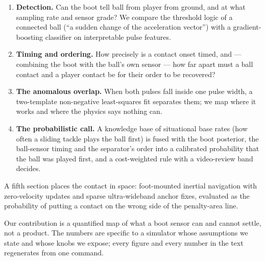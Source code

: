 \begin{enumerate}
\item \textbf{Detection.} Can the boot tell ball from player from ground, and
  at what sampling rate and sensor grade? We compare the threshold logic of a
  connected ball (``a sudden change of the acceleration vector'') with a
  gradient-boosting classifier on interpretable pulse features.
\item \textbf{Timing and ordering.} How precisely is a contact onset timed,
  and --- combining the boot with the ball's own sensor --- how far apart must a
  ball contact and a player contact be for their order to be recovered?
\item \textbf{The anomalous overlap.} When both pulses fall inside one pulse
  width, a two-template non-negative least-squares fit separates them; we map
  where it works and where the physics says nothing can.
\item \textbf{The probabilistic call.} A knowledge base of situational base
  rates (how often a sliding tackle plays the ball first) is fused with the
  boot posterior, the ball-sensor timing and the separator's order into a
  calibrated probability that the ball was played first, and a cost-weighted
  rule with a video-review band decides.
\end{enumerate}
A fifth section places the contact in space: foot-mounted inertial navigation
with zero-velocity updates \cite{foxlin2005pedestrian} and sparse
ultra-wideband anchor fixes, evaluated as the probability of putting a contact
on the wrong side of the penalty-area line.

Our contribution is a quantified map of what a boot sensor can and cannot
settle, not a product. The numbers are specific to a simulator whose
assumptions we state and whose knobs we expose; every figure and every number
in the text regenerates from one command.

